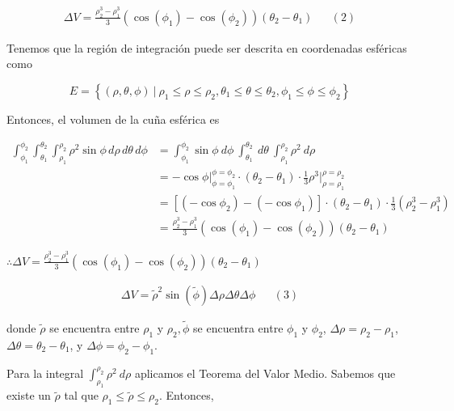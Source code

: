 \documentclass[12pt]{exam}
\begin{document}
\begin{questions}

  \begin{align*}
    \Delta V = \frac{\rho_2^3 - \rho_1^3}{3} (\cos{(\phi_1)} - \cos{(\phi_2)})(\theta_2 - \theta_1) && (2)
  \end{align*}

  Tenemos que la región de integración puede ser descrita en coordenadas esféricas como

  \[
  E = \left\{ (\rho, \theta, \phi) ~ | ~ \rho_1 \leq \rho \leq \rho_2, \theta_1 \leq \theta \leq \theta_2, \phi_1 \leq \phi \leq \phi_2 \right\}
  \]

  Entonces, el volumen de la cuña esférica es

  \begin{align*}
    \int_{\phi_1}^{\phi_2} \int_{\theta_1}^{\theta_2} \int_{\rho_1}^{\rho_2} \rho^2 \sin{\phi} \, d\rho \, d\theta \, d\phi 
    &= \int_{\phi_1}^{\phi_2} \sin{\phi} ~d\phi ~ \int_{\theta_1}^{\theta_2} ~d\theta ~ \int_{\rho_1}^{\rho_2} \rho^2 ~d\rho \\
    &= -\cos{\phi}\Big|_{\phi= \phi_1}^{\phi = \phi_2} \cdot (\theta_2 - \theta_1) \cdot \frac{1}{3} \rho^3\Big|_{\rho = \rho_1}^{\rho = \rho_2}\\
    &= [(-\cos{\phi_2}) - (-\cos{\phi_1})] \cdot (\theta_2 - \theta_1) \cdot \frac{1}{3} (\rho_2^3 - \rho_1^3)\\
    &= \frac{\rho_2^3 - \rho_1^3}{3} (\cos{(\phi_1)} - \cos{(\phi_2)}) (\theta_2 - \theta_1)
  \end{align*}

  $\therefore \Delta V = \frac{\rho_2^3 - \rho_1^3}{3} (\cos{(\phi_1)} - \cos{(\phi_2)}) (\theta_2 - \theta_1)$


  \begin{align*}
    \Delta V = \tilde{\rho}^2 \sin(\tilde{\phi}) \Delta \rho \Delta \theta \Delta \phi && (3)
  \end{align*}

  donde $\tilde{\rho}$ se encuentra entre $\rho_1$ y $\rho_2, \tilde{\phi}$ se encuentra entre $\phi_1$ y $\phi_2$, $\Delta \rho = \rho_2 - \rho_1$, $\Delta \theta = \theta_2 - \theta_1$, y $\Delta \phi = \phi_2 - \phi_1$.

  Para la integral $\int_{\rho_1}^{\rho_2} \rho^2 ~ d\rho$ aplicamos el Teorema del Valor Medio. 
  Sabemos que existe un $\tilde{\rho}$ tal que $\rho_1 \leq \tilde{\rho} \leq \rho_2$. Entonces,


\end{questions}
\end{document}
